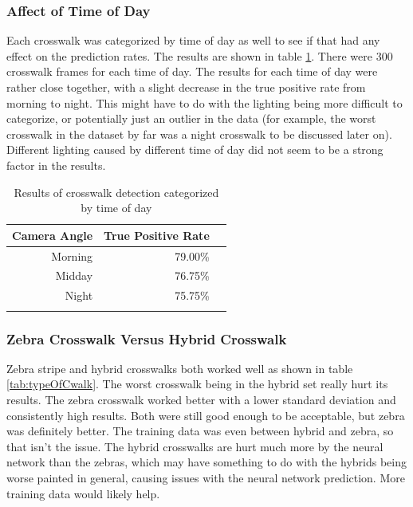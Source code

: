 \documentclass[12pt]{ucthesis}
\begin{document}
\subsubsection{Affect of Time of Day}

Each crosswalk was categorized by time of day as well to see if that had any effect on the prediction rates. The results are shown in table \ref{tab:timeofday}. There were 300 crosswalk frames for each time of day. The results for each time of day were rather close together, with a slight decrease in the true positive rate from morning to night. This might have to do with the lighting being more difficult to categorize, or potentially just an outlier in the data (for example, the worst crosswalk in the dataset by far was a night crosswalk to be discussed later on). Different lighting caused by different time of day did not seem to be a strong factor in the results. 

\begin{center}
    \begin{longtable}{| r | r | r |}
    \hline
    Camera Angle & True Positive Rate \bigstrut\\
    \hline
    Morning & 79.00\% \bigstrut\\
    \hline
    Midday & 76.75\% \bigstrut\\
    \hline
    Night & 75.75\% \bigstrut\\
    \hline

    \caption{Results of crosswalk detection categorized by time of day}
    \label{tab:timeofday} 
    \end{longtable}
\end{center}

\subsubsection{Zebra Crosswalk Versus Hybrid Crosswalk}

Zebra stripe and hybrid crosswalks both worked well as shown in table \ref{tab:typeOfCwalk}. The worst crosswalk being in the hybrid set really hurt its results. The zebra crosswalk worked better with a lower standard deviation and consistently high results. Both were still good enough to be acceptable, but zebra was definitely better. The training data was even between hybrid and zebra, so that isn't the issue. The hybrid crosswalks are hurt much more by the neural network than the zebras, which may have something to do with the hybrids being worse painted in general, causing issues with the neural network prediction. More training data would likely help. 
\end{document}
